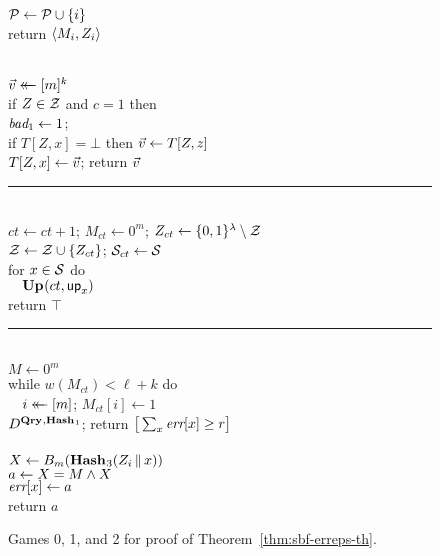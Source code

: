 \begin{figure*}
{  \\[6pt]
  \\[2pt]
    $\mathcal{P} \gets \mathcal{P} \cup \{i\}$\\
    return $\langle M_i, Z_i\rangle$
}
{
  \vspace{-7pt}
  \hfill{}\\[2pt]
    $\vec{v} \mathrel{\leftarrow\mkern-14mu\leftarrow} [m]^k$\\
    if $Z \in \mathcal{Z}$ and $c = 1$ then \\
    \tab $\textit{bad}_1 \gets 1$; \\
    if $T[Z,x] = \bot$ then $\vec{v} \gets T[Z,z]$\\
    $T[Z,x] \gets \vec{v}$; return $\vec{v}$

  \vspace{6pt}\hrule\vspace{3pt}

  \oraclev{$\REPO(\col)$}\hfill{}\\[2pt]
    $ct \gets ct+1$;
    $M_{ct} \gets 0^m$;
    $Z_{ct} \gets \{0,1\}^\lambda\setminus \mathcal{Z}$\\
    $\mathcal{Z} \gets \mathcal{Z} \cup \{Z_{ct}\}$;
    $\mathcal{S}_{ct} \gets \mathcal{S}$\\
    for $x \in \mathcal{S}$ do\\
    $\hspace*{10pt}\textup{\textbf{Up}}\hspace{0.5pt}(ct, \mathsf{up}_x)$\\
    return $\top$

  \vspace{6pt}\hrule\vspace{3pt}

  \\[2pt]
    $M \gets 0^m$\\
    while $w(M_{ct}) < \ell+k$ do\\
    $\hspace*{10pt} i \mathrel{\leftarrow\mkern-14mu\leftarrow} [m]$;
    $M_{ct}[i] \gets 1$\\
    $D^{\textup{\textbf{Qry}}\hspace{0.5pt},\textup{\textbf{Hash}}\hspace{0.5pt}_1}$;
    return $\big[\sum_x \textit{err}[x] \geq r\big]$
  \\[6pt]
  \\[2pt]
    $X \gets {B}_m(\textup{\textbf{Hash}}\hspace{0.5pt}_3(Z_i \, \| \, x))$\\
    $a \gets X = M \wedge X$\\
    $\textit{err}[x] \gets a$\\
    return $a$
}
\caption{Games 0, 1, and 2 for proof of Theorem~\ref{thm:sbf-erreps-th}.}
\label{fig:sbf-erreps-th/games}
\end{figure*}

